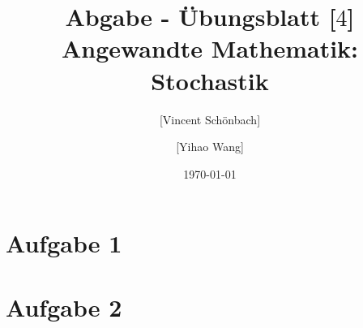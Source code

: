 \documentclass[10pt,a4paper]{article}
\begin{document}
\title{Abgabe - Übungsblatt [$4$]\\
\small{Angewandte Mathematik: Stochastik}}
\author{ [Vincent Schönbach] \and [Yihao Wang]}
\date{\today}
\maketitle

\section*{Aufgabe 1}

\newpage
\section*{Aufgabe 2}
\end{document}
